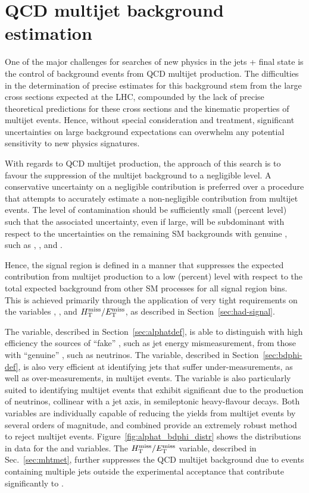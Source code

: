\def\rmhtmet{\mbox{$\mathcal{R}$}\xspace}

\newpage
\section{QCD multijet background estimation\label{sec:qcd}}

One of the major challenges for searches of new physics in the jets +
\met final state is the control of background events from QCD multijet
production. The difficulties in the determination of precise estimates
for this background stem from the large cross sections expected at the
LHC, compounded by the lack of precise theoretical predictions for
these cross sections and the kinematic properties of multijet
events. Hence, without special consideration and treatment,
significant uncertainties on large background expectations can
overwhelm any potential sensitivity to new physics signatures.

With regards to QCD multijet production, the approach of this search
is to favour the suppression of the multijet background to a
negligible level. A conservative uncertainty on a negligible
contribution is preferred over a procedure that attempts to accurately
estimate a non-negligible contribution from multijet events. The level
of contamination should be sufficiently small (\ie percent level) such
that the associated uncertainty, even if large, will be subdominant
with respect to the uncertainties on the remaining SM backgrounds with
genuine \met, such as \wj, \ttbar, and \znunu.

Hence, the signal region is defined in a manner that suppresses the
expected contribution from multijet production to a low (\ie percent)
level with respect to the total expected background from other SM
processes for all signal region bins. This is achieved primarily
through the application of very tight requirements on the variables
\alphat, \bdphi, and $\mbox{$\mbox{$H_{\rm T}^{\rm miss}$} / \mbox{$E_\text{T}^{\rm miss}$}$}$, as described in
Section~\ref{sec:had-signal}. 

The \alphat variable, described in Section~\ref{sec:alphatdef}, is
able to distinguish with high efficiency the sources of ``fake'' \met,
such as jet energy mismeasurement, from those with ``genuine'' \met,
such as neutrinos.  The \bdphi variable, described in
Section~\ref{sec:bdphi-def}, is also very efficient at identifying
jets that suffer under-measurements, as well as over-measurements, in
multijet events. The variable is also particularly suited to
identifying multijet events that exhibit significant \met due to the
production of neutrinos, collinear with a jet axis, in semileptonic
heavy-flavour decays. Both variables are individually capable of
reducing the yields from multijet events by several orders of
magnitude, and combined provide an extremely robust method to reject
multijet events. Figure~\ref{fig:alphat_bdphi_distr} shows the
distributions in data for the \alphat and \bdphi variables. The
$\mbox{$H_{\rm T}^{\rm miss}$}/\mbox{$E_\text{T}^{\rm miss}$}$ variable, described in Sec.~\ref{sec:mhtmet}, further
suppresses the QCD multijet background due to events containing
multiple jets outside the experimental acceptance that contribute
significantly to \mht.

